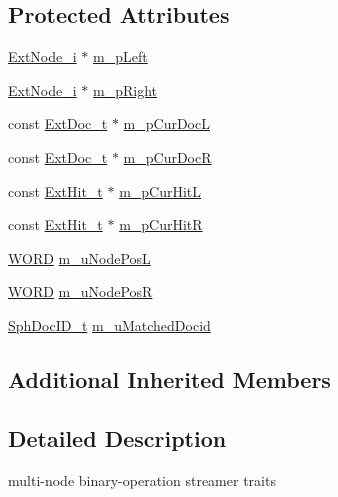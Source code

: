 \subsection*{Protected Attributes}
\begin{DoxyCompactItemize}
\item 
\hyperlink{classExtNode__i}{Ext\-Node\-\_\-i} $\ast$ \hyperlink{classExtTwofer__c_a8fd4cf79da7e34e7949d98533b86f868}{m\-\_\-p\-Left}
\item 
\hyperlink{classExtNode__i}{Ext\-Node\-\_\-i} $\ast$ \hyperlink{classExtTwofer__c_a262d0dec1148f028346cc1454a0c0e3c}{m\-\_\-p\-Right}
\item 
const \hyperlink{structExtDoc__t}{Ext\-Doc\-\_\-t} $\ast$ \hyperlink{classExtTwofer__c_a1848f0ce78a9ce16e3aeecef3524f8b7}{m\-\_\-p\-Cur\-Doc\-L}
\item 
const \hyperlink{structExtDoc__t}{Ext\-Doc\-\_\-t} $\ast$ \hyperlink{classExtTwofer__c_ac72f344c896f0d77f3afd00282dd7c07}{m\-\_\-p\-Cur\-Doc\-R}
\item 
const \hyperlink{structExtHit__t}{Ext\-Hit\-\_\-t} $\ast$ \hyperlink{classExtTwofer__c_aee742f3c38d38128f380748442b9b25f}{m\-\_\-p\-Cur\-Hit\-L}
\item 
const \hyperlink{structExtHit__t}{Ext\-Hit\-\_\-t} $\ast$ \hyperlink{classExtTwofer__c_ae57e3440646961917a3f732f3b184028}{m\-\_\-p\-Cur\-Hit\-R}
\item 
\hyperlink{sphinxstd_8h_a197942eefa7db30960ae396d68339b97}{W\-O\-R\-D} \hyperlink{classExtTwofer__c_ac93212211d86eeea38c90f60c4febd38}{m\-\_\-u\-Node\-Pos\-L}
\item 
\hyperlink{sphinxstd_8h_a197942eefa7db30960ae396d68339b97}{W\-O\-R\-D} \hyperlink{classExtTwofer__c_a1e25ea1d556b0a7345cc7d191910cb83}{m\-\_\-u\-Node\-Pos\-R}
\item 
\hyperlink{sphinx_8h_a3176771631c12a9e4897272003e6b447}{Sph\-Doc\-I\-D\-\_\-t} \hyperlink{classExtTwofer__c_ab06295733840d9cb3c0fd4ffd92d23ea}{m\-\_\-u\-Matched\-Docid}
\end{DoxyCompactItemize}
\subsection*{Additional Inherited Members}


\subsection{Detailed Description}
multi-\/node binary-\/operation streamer traits 

